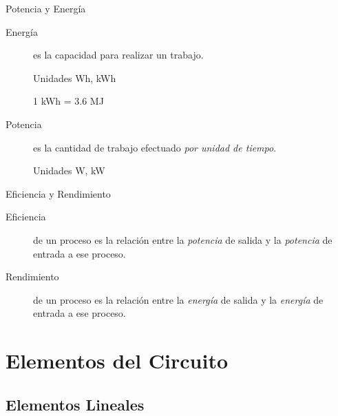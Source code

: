 \documentclass[xcolor={usenames,svgnames,dvipsnames}]{beamer}
\begin{document}
\begin{frame}[label={sec:orgac55320}]{Potencia y Energía}
\begin{description}
\item[{Energía}] es la capacidad para realizar un trabajo.

Unidades Wh, kWh

1 kWh = 3.6 MJ

\item[{Potencia}] es la cantidad de trabajo efectuado \emph{por unidad de
tiempo}.

Unidades W, kW
\end{description}
\end{frame}

\begin{frame}[label={sec:orgac92289}]{Eficiencia y Rendimiento}
\begin{description}
\item[{Eficiencia}] de un proceso es la relación entre la \emph{potencia} de
salida y la \emph{potencia} de entrada a ese proceso.

\item[{Rendimiento}] de un proceso es la relación entre la \emph{energía} de
salida y la \emph{energía} de entrada a ese proceso.
\end{description}
\end{frame}

\section{Elementos del Circuito}
\label{sec:org81df1b5}
\subsection{Elementos Lineales}
\label{sec:org9e6364b}
\end{document}
